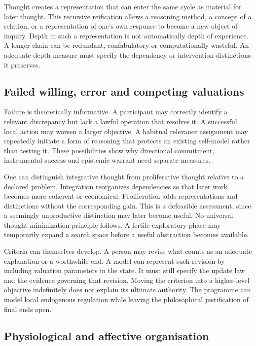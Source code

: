 \documentclass[
  11pt,
  a4paper,
]{article}
\begin{document}
Thought creates a representation that can enter the same cycle as
material for later thought. This recursive reification allows a
reasoning method, a concept of a relation, or a representation of one's
own response to become a new object of inquiry. Depth in such a
representation is not automatically depth of experience. A longer chain
can be redundant, confabulatory or computationally wasteful. An adequate
depth measure must specify the dependency or intervention distinctions
it preserves.

\subsection{Failed willing, error and competing
valuations}\label{failed-willing-error-and-competing-valuations}

Failure is theoretically informative. A participant may correctly
identify a relevant discrepancy but lack a lawful operation that
resolves it. A successful local action may worsen a larger objective. A
habitual relevance assignment may repeatedly initiate a form of
reasoning that protects an existing self-model rather than testing it.
These possibilities show why directional commitment, instrumental
success and epistemic warrant need separate measures.

One can distinguish integrative thought from proliferative thought
relative to a declared problem. Integration reorganizes dependencies so
that later work becomes more coherent or economical. Proliferation adds
representations and distinctions without the corresponding gain. This is
a defeasible assessment, since a seemingly unproductive distinction may
later become useful. No universal thought-minimization principle
follows. A fertile exploratory phase may temporarily expand a search
space before a useful abstraction becomes available.

Criteria can themselves develop. A person may revise what counts as an
adequate explanation or a worthwhile end. A model can represent such
revision by including valuation parameters in the state. It must still
specify the update law and the evidence governing that revision. Moving
the criterion into a higher-level objective indefinitely does not
explain its ultimate authority. The programme can model local endogenous
regulation while leaving the philosophical justification of final ends
open.

\subsection{Physiological and affective
organisation}\label{physiological-and-affective-organization}
\end{document}
